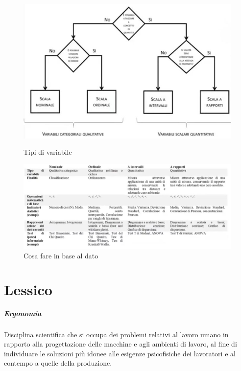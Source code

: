 \documentclass[11pt,a4paper]{book}
\begin{document}
\begin{figure}[h!]
	\begin{center}
		\includegraphics[scale=0.6]{img/023.jpg}
		\caption{Tipi di variabile}
		\label{fig: 023}
	\end{center}
	\begin{center}
		\includegraphics[scale=0.6]{img/024.jpg}
		\caption{Cosa fare in base al dato}
		\label{fig: 024}
	\end{center}	
\end{figure}


\chapter{Lessico}
\paragraph{Ergonomia}
Disciplina scientifica che si occupa dei problemi relativi al lavoro umano in rapporto alla progettazione delle macchine e agli ambienti di lavoro, al fine di individuare le soluzioni più idonee alle esigenze psicofisiche dei lavoratori e al contempo a quelle della produzione.
\end{document}
